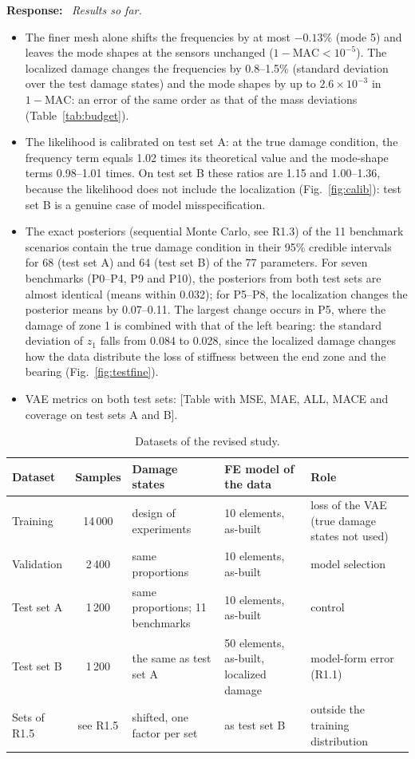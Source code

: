 \documentclass[11pt]{article}
\newenvironment{response}{\par\smallskip\noindent\color{resp}\textbf{Response:}\ }{\par}
\newcommand{\tbd}[1]{\textcolor{note}{\textsf{[#1]}}}
\begin{document}
\begin{response}
\textit{Results so far.}
\begin{itemize}[leftmargin=*]
\item The finer mesh alone shifts the frequencies by at most $-0.13\%$ (mode 5) and leaves the mode shapes at the sensors
unchanged ($1-\mathrm{MAC}<10^{-5}$). The localized damage changes the frequencies by 0.8--1.5\% (standard deviation over
the test damage states) and the mode shapes by up to $2.6\times10^{-3}$ in $1-\mathrm{MAC}$: an error of the same order
as that of the mass deviations (Table~\ref{tab:budget}).
\item The likelihood is calibrated on test set A: at the true damage condition, the frequency term equals 1.02 times its
theoretical value and the mode-shape terms 0.98--1.01 times. On test set B these ratios are 1.15 and 1.00--1.36,
because the likelihood does not include the localization (Fig.~\ref{fig:calib}): test set B is a genuine case of model
misspecification.
\item The exact posteriors (sequential Monte Carlo, see R1.3) of the 11 benchmark scenarios contain the true damage
condition in their 95\% credible intervals for 68 (test set A) and 64 (test set B) of the 77 parameters. For seven
benchmarks (P0--P4, P9 and P10), the posteriors from both test sets are almost identical (means within 0.032); for
P5--P8, the localization changes the posterior means by 0.07--0.11. The largest change occurs in P5, where the damage of zone 1
is combined with that of the left bearing: the standard deviation of $z_1$ falls from 0.084 to 0.028, since the localized damage
changes how the data distribute the loss of stiffness between the end zone and the bearing (Fig.~\ref{fig:testfine}).
\item VAE metrics on both test sets: \tbd{Table with MSE, MAE, ALL, MACE and coverage on test sets A and B}.
\end{itemize}
\end{response}

\begin{table}[H]
\centering\small
\caption{Datasets of the revised study.}
\label{tab:datasets}
\footnotesize
\begin{tabular}{p{2.7cm}cp{3.5cm}p{3.1cm}p{3.5cm}}
\toprule
Dataset & Samples & Damage states & FE model of the data & Role \\
\midrule
Training & 14\,000 & design of experiments & 10 elements, as-built & loss of the VAE (true damage states not used) \\
Validation & 2\,400 & same proportions & 10 elements, as-built & model selection \\
Test set A & 1\,200 & same proportions; 11 benchmarks & 10 elements, as-built & control \\
Test set B & 1\,200 & the same as test set A & 50 elements, as-built, localized damage & model-form error (R1.1) \\
Sets of R1.5 & see R1.5 & shifted, one factor per set & as test set B & outside the training distribution \\
\bottomrule
\end{tabular}
\end{table}
\end{document}
